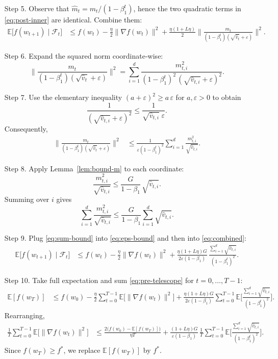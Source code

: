 \documentclass{article}
\newcommand{\E}{\mathbb{E}}
\begin{document}
\begin{enumerate}
\item[Step 5.] Observe that $\hat m_t = m_t/(1-\beta_1^{t})$, hence the two quadratic terms in \eqref{eq:post-inner} are identical. Combine them:
\begin{align}
\E\!\big[f(w_{t+1})\mid\mathcal{F}_{t}\big]
&\le f(w_t)-\frac{\eta}{2}\|\nabla f(w_t)\|^2
+\frac{\eta(1+L\eta)}{2}\Big\|\frac{m_t}{(1-\beta_1^{t})(\sqrt{\hat v_t}+\varepsilon)}\Big\|^2 .
\label{eq:combined}
\end{align}

\item[Step 6.] Expand the squared norm coordinate‑wise:
\[
\Big\|\frac{m_t}{(1-\beta_1^{t})(\sqrt{\hat v_t}+\varepsilon)}\Big\|^2
=\sum_{i=1}^{d}\frac{m_{t,i}^2}{(1-\beta_1^{t})^2\,(\sqrt{\hat v_{t,i}}+\varepsilon)^2}.
\]

\item[Step 7.] Use the elementary inequality $(a+\varepsilon)^2\ge a\,\varepsilon$ for $a,\varepsilon>0$ to obtain
\[
\frac{1}{(\sqrt{\hat v_{t,i}}+\varepsilon)^2}\le\frac{1}{\sqrt{\hat v_{t,i}}\;\varepsilon}.
\]
Consequently,
\begin{align}
\Big\|\frac{m_t}{(1-\beta_1^{t})(\sqrt{\hat v_t}+\varepsilon)}\Big\|^2
&\le\frac{1}{\varepsilon(1-\beta_1^{t})^2}
\sum_{i=1}^{d}\frac{m_{t,i}^2}{\sqrt{\hat v_{t,i}}}.
\label{eq:eps-bound}
\end{align}

\item[Step 8.] Apply Lemma~\ref{lem:bound-m} to each coordinate:
\[
\frac{m_{t,i}^2}{\sqrt{\hat v_{t,i}}}\le\frac{G}{1-\beta_1}\,\sqrt{\hat v_{t,i}} .
\]
Summing over $i$ gives
\[
\sum_{i=1}^{d}\frac{m_{t,i}^2}{\sqrt{\hat v_{t,i}}}
\le\frac{G}{1-\beta_1}\sum_{i=1}^{d}\sqrt{\hat v_{t,i}} .
\label{eq:sum-bound}
\]

\item[Step 9.] Plug \eqref{eq:sum-bound} into \eqref{eq:eps-bound} and then into \eqref{eq:combined}:
\begin{align}
\E\!\big[f(w_{t+1})\mid\mathcal{F}_{t}\big]
&\le f(w_t)-\frac{\eta}{2}\|\nabla f(w_t)\|^2
+\frac{\eta(1+L\eta)G}{2\varepsilon(1-\beta_1)}\,
\frac{\sum_{i=1}^{d}\sqrt{\hat v_{t,i}}}{(1-\beta_1^{t})^2}.
\label{eq:pre-telescope}
\end{align}

\item[Step 10.] Take full expectation and sum \eqref{eq:pre-telescope} for $t=0,\dots,T-1$:
\begin{align}
\E[f(w_T)] &\le f(w_0)-\frac{\eta}{2}\sum_{t=0}^{T-1}\E\!\big[\|\nabla f(w_t)\|^2\big]
+\frac{\eta(1+L\eta)G}{2\varepsilon(1-\beta_1)}\sum_{t=0}^{T-1}\E\!\Big[\frac{\sum_{i=1}^{d}\sqrt{\hat v_{t,i}}}{(1-\beta_1^{t})^2}\Big].
\label{eq:telescope}
\end{align}
Rearranging,
\begin{align}
\frac{1}{T}\sum_{t=0}^{T-1}\E\!\big[\|\nabla f(w_t)\|^2\big]
&\le \frac{2\big(f(w_0)-\E[f(w_T)]\big)}{\eta T}
+\frac{(1+L\eta)G}{\varepsilon(1-\beta_1)}\,
\frac{1}{T}\sum_{t=0}^{T-1}\E\!\Big[\frac{\sum_{i=1}^{d}\sqrt{\hat v_{t,i}}}{(1-\beta_1^{t})^2}\Big].
\label{eq:avg-grad}
\end{align}
Since $f(w_T)\ge f^*$, we replace $\E[f(w_T)]$ by $f^*$.


\end{enumerate}
\end{document}
